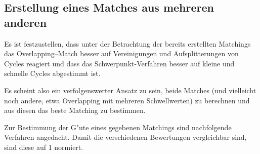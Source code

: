 \subsection{Erstellung eines Matches aus mehreren anderen}\label{bewertung}


Es ist festzustellen, dass unter der Betrachtung der bereits erstellten Matchings das Overlapping--Match besser auf Vereinigungen und Aufsplitterungen von Cycles reagiert und dass das Schwerpunkt-Verfahren besser auf kleine und schnelle Cycles abgestimmt ist. 

Es scheint also ein verfolgenswerter Ansatz zu sein, beide Matches (und vielleicht noch andere, etwa Overlapping mit mehreren Schwellwerten) zu berechnen und aus diesen das beste Matching zu bestimmen. 

Zur Bestimmung der G"ute eines gegebenen Matchings sind nachfolgende Verfahren angedacht. Damit die verschiedenen Bewertungen vergleichbar sind, sind diese auf 1 normiert.

